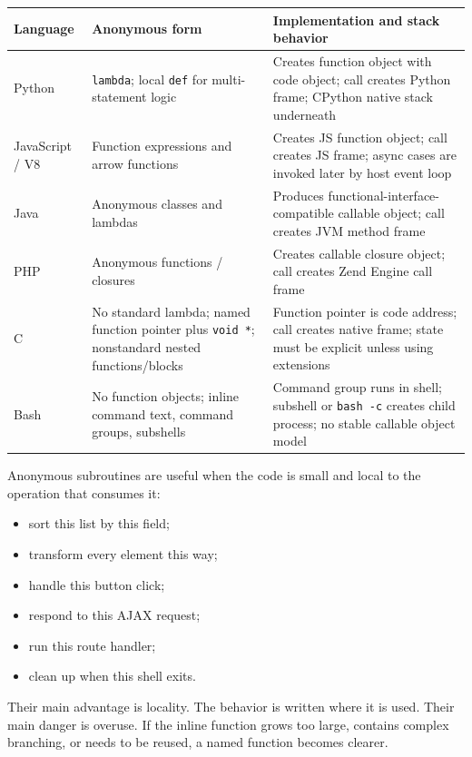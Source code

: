 \begin{center}
\begin{tabular}{|p{}|p{}|p{}|}
\hline
\textbf{Language} & \textbf{Anonymous form} & \textbf{Implementation and stack behavior} \\
\hline
Python & \texttt{lambda}; local \texttt{def} for multi-statement logic & Creates function object with code object; call creates Python frame; CPython native stack underneath \\
\hline
JavaScript / V8 & Function expressions and arrow functions & Creates JS function object; call creates JS frame; async cases are invoked later by host event loop \\
\hline
Java & Anonymous classes and lambdas & Produces functional-interface-compatible callable object; call creates JVM method frame \\
\hline
PHP & Anonymous functions / closures & Creates callable closure object; call creates Zend Engine call frame \\
\hline
C & No standard lambda; named function pointer plus \texttt{void *}; nonstandard nested functions/blocks & Function pointer is code address; call creates native frame; state must be explicit unless using extensions \\
\hline
Bash & No function objects; inline command text, command groups, subshells & Command group runs in shell; subshell or \texttt{bash -c} creates child process; no stable callable object model \\
\hline
\end{tabular}
\end{center}

Anonymous subroutines are useful when the code is small and local to the operation that consumes it:

\begin{itemize}
    \item sort this list by this field;
    \item transform every element this way;
    \item handle this button click;
    \item respond to this AJAX request;
    \item run this route handler;
    \item clean up when this shell exits.
\end{itemize}

Their main advantage is locality. The behavior is written where it is used. Their main danger is overuse. If the inline function grows too large, contains complex branching, or needs to be reused, a named function becomes clearer.

